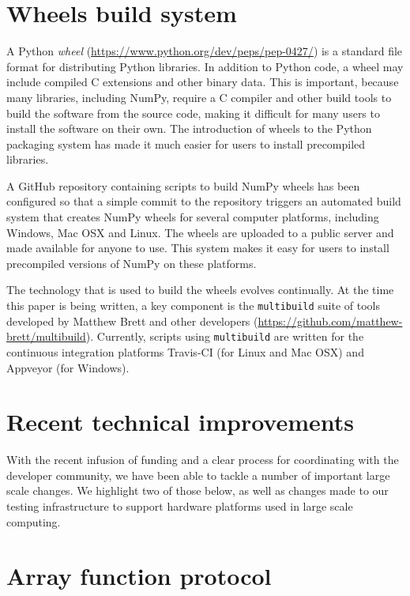 \documentclass{article}
\begin{document}
\section*{Wheels build system}

A Python \emph{wheel} (\url{https://www.python.org/dev/peps/pep-0427/})
is a standard file format for distributing Python libraries.
In addition to Python code, a wheel may include compiled
C extensions and other binary data.
This is important, because many libraries, including NumPy,
require a C compiler and other build tools to build the software
from the source code, making it difficult for many users to install
the software on their own.  The introduction of wheels to the Python
packaging system has made it much easier for users to install
precompiled libraries.

A GitHub repository containing scripts to build NumPy wheels has
been configured so that a simple commit to the repository triggers
an automated build system that creates NumPy wheels for several
computer platforms, including Windows, Mac OSX and Linux.  The wheels
are uploaded to a public server and made available for anyone to use.
This system makes it easy for users to install precompiled versions
of NumPy on these platforms.

The technology that is used to build the wheels evolves continually.
At the time this paper is being written, a key component is the
\texttt{multibuild} suite of tools developed by Matthew Brett and
other developers (\url{https://github.com/matthew-brett/multibuild}).
Currently, scripts using \texttt{multibuild} are written for
the continuous integration platforms Travis-CI (for Linux and Mac OSX)
and Appveyor (for Windows).

\section*{Recent technical improvements}

With the recent infusion of funding and a clear process for coordinating with
the developer community, we have been able to tackle a number of important
large scale changes.
We highlight two of those below, as well as changes made to our testing
infrastructure to support hardware platforms used in large scale computing.

\section*{Array function protocol}
\end{document}
